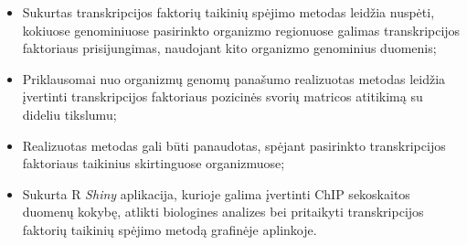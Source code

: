 \documentclass[12pt]{article}
\begin{document}
\begin{itemize}
    \item Sukurtas transkripcijos faktorių taikinių spėjimo metodas leidžia
        nuspėti, kokiuose genominiuose pasirinkto organizmo regionuose
        galimas transkripcijos faktoriaus prisijungimas, naudojant kito
        organizmo genominius duomenis;
    \item Priklausomai nuo organizmų genomų panašumo realizuotas metodas
        leidžia įvertinti transkripcijos faktoriaus pozicinės svorių matricos
        atitikimą su dideliu tikslumu;
    \item Realizuotas metodas gali būti panaudotas, spėjant pasirinkto
        transkripcijos faktoriaus taikinius skirtinguose organizmuose;
    \item Sukurta R \emph{Shiny} aplikacija, kurioje galima įvertinti ChIP
        sekoskaitos duomenų kokybę, atlikti biologines analizes bei pritaikyti
        transkripcijos faktorių taikinių spėjimo metodą grafinėje aplinkoje.
\end{itemize}

\newpage

\end{document}
